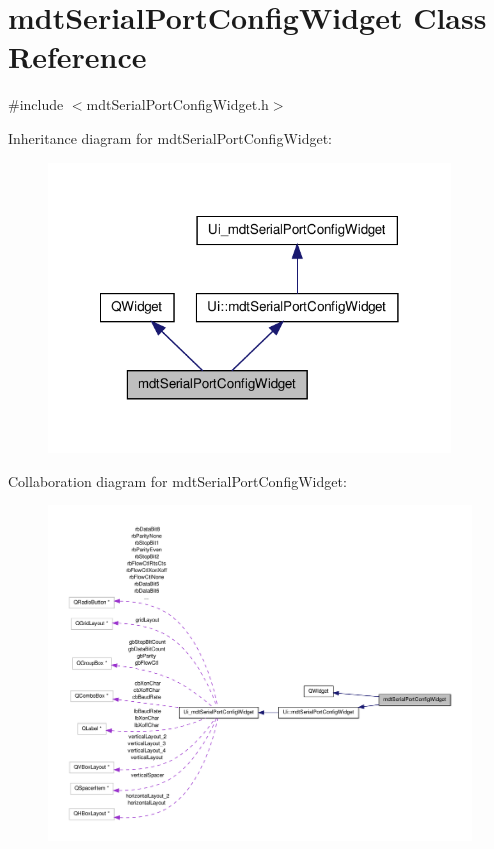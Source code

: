 \hypertarget{classmdt_serial_port_config_widget}{\section{mdt\-Serial\-Port\-Config\-Widget Class Reference}
\label{classmdt_serial_port_config_widget}
}


{\ttfamily \#include $<$mdt\-Serial\-Port\-Config\-Widget.\-h$>$}



Inheritance diagram for mdt\-Serial\-Port\-Config\-Widget\-:
\nopagebreak
\begin{figure}[H]
\begin{center}
\leavevmode
\includegraphics[width=302pt]{classmdt_serial_port_config_widget__inherit__graph}
\end{center}
\end{figure}


Collaboration diagram for mdt\-Serial\-Port\-Config\-Widget\-:
\nopagebreak
\begin{figure}[H]
\begin{center}
\leavevmode
\includegraphics[width=350pt]{classmdt_serial_port_config_widget__coll__graph}
\end{center}
\end{figure}
